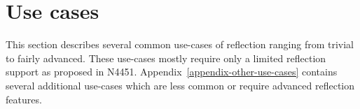 \section{Use cases}
\label{section-use-cases}

This section describes several common use-cases of reflection ranging from trivial to fairly advanced.
These use-cases mostly require only a limited reflection support as proposed in N4451.
Appendix~\ref{appendix-other-use-cases} contains
several additional use-cases which are less common or require advanced reflection features.








